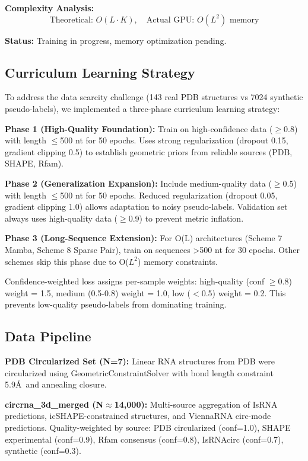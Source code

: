 \documentclass[12pt]{article}
\begin{document}
\textbf{Complexity Analysis:}
\begin{equation}
\text{Theoretical: } O(L \cdot K), \quad \text{Actual GPU: } O(L^2) \text{ memory}
\end{equation}

\textbf{Status:} Training in progress, memory optimization pending.

\subsection{Curriculum Learning Strategy}

To address the data scarcity challenge (143 real PDB structures vs 7024 synthetic pseudo-labels), we implemented a three-phase curriculum learning strategy:

\textbf{Phase 1 (High-Quality Foundation):} Train on high-confidence data ($\geq$0.8) with length $\leq$500 nt for 50 epochs. Uses strong regularization (dropout 0.15, gradient clipping 0.5) to establish geometric priors from reliable sources (PDB, SHAPE, Rfam).

\textbf{Phase 2 (Generalization Expansion):} Include medium-quality data ($\geq$0.5) with length $\leq$500 nt for 50 epochs. Reduced regularization (dropout 0.05, gradient clipping 1.0) allows adaptation to noisy pseudo-labels. Validation set always uses high-quality data ($\geq$0.9) to prevent metric inflation.

\textbf{Phase 3 (Long-Sequence Extension):} For O(L) architectures (Scheme 7 Mamba, Scheme 8 Sparse Pair), train on sequences >500 nt for 30 epochs. Other schemes skip this phase due to O($L^2$) memory constraints.

Confidence-weighted loss assigns per-sample weights: high-quality (conf $\geq$0.8) weight = 1.5, medium (0.5-0.8) weight = 1.0, low ($<$0.5) weight = 0.2. This prevents low-quality pseudo-labels from dominating training.

\subsection{Data Pipeline}

\textbf{PDB Circularized Set (N=7):} Linear RNA structures from PDB were circularized using GeometricConstraintSolver with bond length constraint 5.9\AA\ and annealing closure.

\textbf{circrna\_3d\_merged (N$\approx$14,000):} Multi-source aggregation of IsRNA predictions, icSHAPE-constrained structures, and ViennaRNA circ-mode predictions. Quality-weighted by source: PDB circularized (conf=1.0), SHAPE experimental (conf=0.9), Rfam consensus (conf=0.8), IsRNAcirc (conf=0.7), synthetic (conf=0.3).
\end{document}
